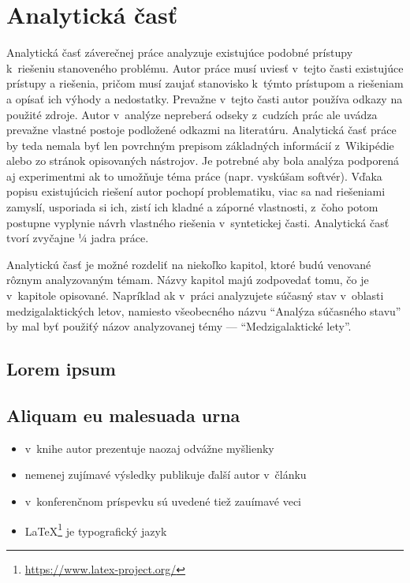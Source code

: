 
\chapter{Analytická časť}

Analytická časť záverečnej práce analyzuje existujúce podobné prístupy k~riešeniu stanoveného problému. Autor práce musí uviesť v~tejto časti existujúce prístupy a riešenia, pričom musí zaujať stanovisko k~týmto prístupom a riešeniam a opísať ich výhody a nedostatky. Prevažne v~tejto časti autor používa odkazy na použité zdroje. Autor v~analýze nepreberá odseky z~cudzích prác ale uvádza prevažne vlastné postoje podložené odkazmi na literatúru. Analytická časť práce by teda nemala byť len povrchným prepisom základných informácií z~Wikipédie alebo zo stránok opisovaných nástrojov. Je potrebné aby bola analýza podporená aj experimentmi ak to umožňuje téma práce (napr. vyskúšam softvér). Vďaka popisu existujúcich riešení autor pochopí problematiku, viac sa nad riešeniami zamyslí, usporiada si ich, zistí ich kladné a záporné vlastnosti, z~čoho potom postupne vyplynie návrh vlastného riešenia v~syntetickej časti. Analytická časť tvorí zvyčajne ¼ jadra práce.

Analytickú časť je možné rozdeliť na niekoľko kapitol, ktoré budú venované rôznym analyzovaným témam. Názvy kapitol majú zodpovedať tomu, čo je v~kapitole opisované. Napríklad ak v~práci analyzujete súčasný stav v~oblasti medzigalaktických letov, namiesto všeobecného názvu "`Analýza súčasného stavu"' by mal byť použiťý názov analyzovanej témy --- "`Medzigalaktické lety"'.

\section{Lorem ipsum}
\blindtext

\section{Aliquam eu malesuada urna}
\blindtext
\begin{itemize}
    \item v~knihe \cite{book} autor prezentuje naozaj odvážne myšlienky
    \item nemenej zujímavé výsledky publikuje ďalší autor v~článku \cite{article} 
    \item v~konferenčnom príspevku \cite{conference} sú uvedené tiež zauímavé veci
    \item \LaTeX{}\footnote{\url{https://www.latex-project.org/}} je typografický jazyk
\end{itemize}


